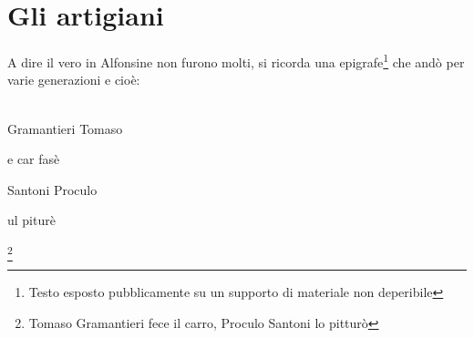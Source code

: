 
\chapter{Gli artigiani}

A dire il vero in Alfonsine non furono molti, si ricorda una epigrafe\footnote{Testo esposto pubblicamente su un supporto di materiale non deperibile} che andò per varie generazioni e cioè:
\\\\
\textcal \Huge
	\centerline{Gramantieri Tomaso}
	\centerline{e car fasè}
	\centerline{Santoni Proculo}
	\centerline{ul piturè}\footnote{Tomaso Gramantieri fece il carro, Proculo Santoni lo pitturò}
\normalfont \normalsize
{}

